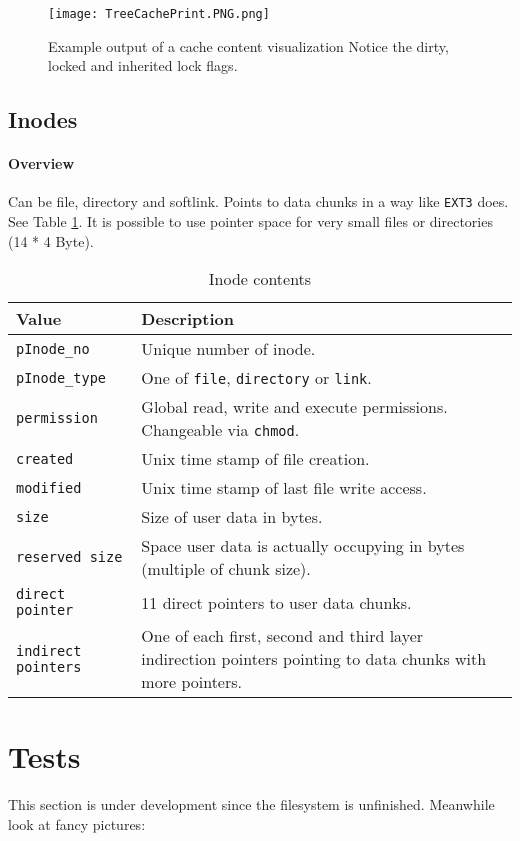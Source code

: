 \begin{figure}[htp]
	\centering\texttt{[image: TreeCachePrint.PNG.png]}
	\caption{\label{fig:TreeCachePrint}Example output of a cache content visualization Notice the dirty, locked and inherited lock flags.}
\end{figure}

\subsection{Inodes}
\label{inode}
\paragraph{Overview}
Can be file, directory and softlink. Points to data chunks in a way like \texttt{EXT3} does. See Table \ref{tab:pinode}. It is possible to use pointer space for very small files or directories (14 * 4 Byte).
\begin{table}[htbp]
\caption{Inode contents}
\label{tab:pinode}
\begin{tabularx}{\textwidth}{lp{11cm}p{2.5cm}}
\toprule
Value & Description\\
\midrule
\texttt{pInode\_no} & Unique number of inode. \\
\texttt{pInode\_type} & One of \texttt{file}, \texttt{directory} or \texttt{link}.\\
\texttt{permission} & Global read, write and execute permissions. Changeable via \texttt{chmod}.\\
\texttt{created} & Unix time stamp of file creation.\\
\texttt{modified} & Unix time stamp of last file write access.\\
\texttt{size} & Size of user data in bytes. \\
\texttt{reserved size} & Space user data is actually occupying in bytes (multiple of chunk size).\\
\texttt{direct pointer} & 11 direct pointers to user data chunks.\\
\texttt{indirect pointers} & One of each first, second and third layer indirection pointers pointing to data chunks with more pointers.\\
\bottomrule
\end{tabularx}
\end{table} 

\section{Tests}
\begin{flushleft}
	
\end{flushleft}
This section is under development since the filesystem is unfinished. Meanwhile look at fancy pictures:

